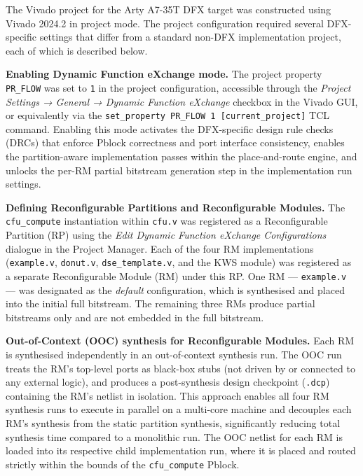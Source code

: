 The Vivado project for the Arty A7-35T DFX target was constructed using Vivado 2024.2 in project mode. The project configuration required several DFX-specific settings that differ from a standard non-DFX implementation project, each of which is described below.

\textbf{Enabling Dynamic Function eXchange mode.} The project property \texttt{PR\_FLOW} was set to \texttt{1} in the project configuration, accessible through the \textit{Project Settings → General → Dynamic Function eXchange} checkbox in the Vivado GUI, or equivalently via the \texttt{set\_property PR\_FLOW 1 [current\_project]} TCL command. Enabling this mode activates the DFX-specific design rule checks (DRCs) that enforce Pblock correctness and port interface consistency, enables the partition-aware implementation passes within the place-and-route engine, and unlocks the per-RM partial bitstream generation step in the implementation run settings.

\textbf{Defining Reconfigurable Partitions and Reconfigurable Modules.} The \texttt{cfu\_compute} instantiation within \texttt{cfu.v} was registered as a Reconfigurable Partition (RP) using the \textit{Edit Dynamic Function eXchange Configurations} dialogue in the Project Manager. Each of the four RM implementations (\texttt{example.v}, \texttt{donut.v}, \texttt{dse\_template.v}, and the KWS module) was registered as a separate Reconfigurable Module (RM) under this RP. One RM — \texttt{example.v} — was designated as the \textit{default} configuration, which is synthesised and placed into the initial full bitstream. The remaining three RMs produce partial bitstreams only and are not embedded in the full bitstream.

\textbf{Out-of-Context (OOC) synthesis for Reconfigurable Modules.} Each RM is synthesised independently in an out-of-context synthesis run. The OOC run treats the RM's top-level ports as black-box stubs (not driven by or connected to any external logic), and produces a post-synthesis design checkpoint (\texttt{.dcp}) containing the RM's netlist in isolation. This approach enables all four RM synthesis runs to execute in parallel on a multi-core machine and decouples each RM's synthesis from the static partition synthesis, significantly reducing total synthesis time compared to a monolithic run. The OOC netlist for each RM is loaded into its respective child implementation run, where it is placed and routed strictly within the bounds of the \texttt{cfu\_compute} Pblock.

